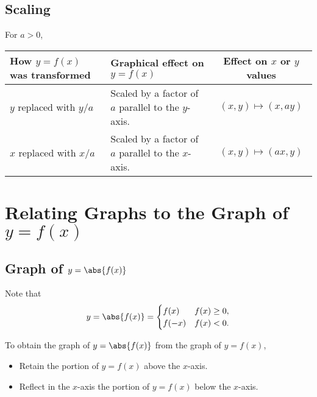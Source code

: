 \subsection{Scaling}

For $a > 0$,

\begin{table}[H]
    \centering
    \begin{tabularx}{\columnwidth}{|>{\centering\arraybackslash}X|>{\centering\arraybackslash}X|c|}
    \hline
    \textbf{How $y = f(x)$ was transformed} & \textbf{Graphical effect on $y = f(x)$} & \textbf{Effect on $x$ or $y$ values} \\ \hline\hline
    $y$ replaced with $y/a$ & Scaled by a factor of $a$ parallel to the $y$-axis. & $(x, y) \mapsto (x, ay)$ \\ \hline
    $x$ replaced with $x/a$ & Scaled by a factor of $a$ parallel to the $x$-axis. & $(x, y) \mapsto (ax, y)$ \\ \hline
    \end{tabularx}
\end{table}

\section{Relating Graphs to the Graph of \texorpdfstring{$y = f(x)$}{y = f(x)}}

\subsection{Graph of \texorpdfstring{$y = \abs{f(x)}$}{y = |f(x)|}}

Note that \[y = \abs{f(x)} = \begin{cases}
    f(x) & f(x) \geq 0,\\
    f(-x) & f(x) < 0.
\end{cases}\]

\begin{recipe}[Graph of $y = \abs{f(x)}$]
    To obtain the graph of $y = \abs{f(x)}$ from the graph of $y = f(x)$,
    \begin{itemize}
        \item Retain the portion of $y = f(x)$ above the $x$-axis.
        \item Reflect in the $x$-axis the portion of $y = f(x)$ below the $x$-axis.
    \end{itemize}
\end{recipe}


